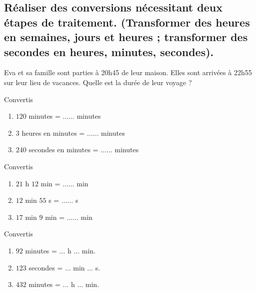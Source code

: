 \begin{minipage}{0.7\linewidth}


\end{minipage}




\subsection{ Réaliser des conversions nécessitant deux étapes de traitement. (Transformer des heures en semaines, jours et heures ; transformer des secondes en heures, minutes, secondes).}


Eva et sa famille sont parties à 20h45 de leur maison. Elles sont arrivées à 22h55 sur leur lieu de vacances. Quelle est la durée de leur voyage ?



Convertis 
\begin{enumerate}
\item $120$ minutes = $\ldots\ldots$ minutes 
\item $3$ heures en minutes = $\ldots\ldots$ minutes 
\item $240$ secondes en minutes = $\ldots\ldots$ minutes 
\end{enumerate}


Convertis

\begin{enumerate}
\item $21$ h  $12$ min = $\ldots\ldots$ min
\item $12$ min  $55$ s = $\ldots\ldots$ s
\item $17$ min  $9$ min = $\ldots\ldots$ min
\end{enumerate}




Convertis

\begin{enumerate}
\item $92$ minutes = $\ldots$ h  $\ldots$ min.
\item $123$ secondes = $\ldots$ min  $\ldots$ s. 
\item $432$ minutes = $\ldots$ h  $\ldots$ min.
\end{enumerate}



